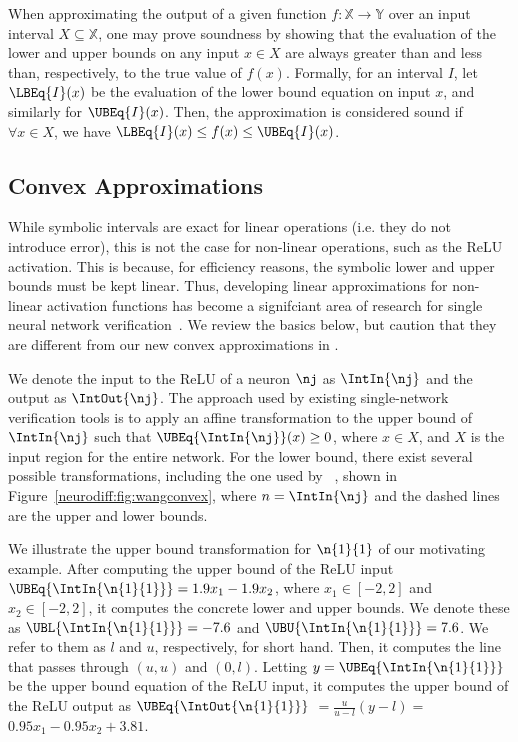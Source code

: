 When approximating the output of a given function $ f
: \mathbb{X} \to \mathbb{Y} $ over an input interval $
X \subseteq \mathbb{X} $, one may prove soundness by showing that the
evaluation of the lower and upper bounds on any input $ x \in X $ are
always greater than and less than, respectively, to the true value of
$ f(x) $.
%
Formally, for an interval $ I $, let $ \LBEq{I}(x) $ be the evaluation
of the lower bound equation on input $ x $, and similarly for
$ \UBEq{I}(x) $. Then, the approximation is considered sound if
$ \forall x \in X$, we have $\LBEq{I}(x) \leq f(x) \leq \UBEq{I}(x) $.

\subsection{Convex Approximations}
While symbolic intervals are exact for linear operations
(i.e. they do not introduce error), this is not the case
for non-linear operations, such as the ReLU activation.
This is because, for efficiency
reasons, the symbolic lower and upper bounds must be kept linear.
Thus, developing linear approximations for non-linear activation
functions has become a signifciant area of research for single neural
network
verification~\cite{WangPWYJ18nips,SinghGPV19,WengZCSHDBD18,zhang2018efficient}. We
review the basics below, but caution that they are different from our
new convex approximations in \Name{}.

We denote the input to the ReLU of a neuron $ \nj $ as $ \IntIn{\nj} $
and the output as $ \IntOut{\nj} $. The approach used by existing
single-network verification tools is to apply an affine transformation
to the upper bound of $ \IntIn{\nj} $ such that
$ \UBEq{\IntIn{\nj}}(x) \geq 0 $, where $ x \in X $, and $ X $ is the
input region for the entire network.  For the lower bound, there exist
several possible transformations, including the one used
by \Neurify{}~\cite{WangPWYJ18nips}, shown in
Figure~\ref{neurodiff:fig:wangconvex}, where $n = \IntIn{\nj}$ and the dashed
lines are the upper and lower bounds.

We illustrate the upper bound transformation for $ \n{1}{1} $ of our
motivating example. After computing the upper bound of the ReLU
input $ \UBEq{\IntIn{\n{1}{1}}} = 1.9x_1 - 1.9x_2 $, where
$x_1\in[-2,2]$ and $x_2\in[-2,2]$, it computes the concrete lower and
upper bounds. We denote these as $ \UBL{\IntIn{\n{1}{1}}} = -7.6 $
and $ \UBU{\IntIn{\n{1}{1}}} = 7.6 $. We refer to them as $ l $ and $
u $, respectively, for short hand. Then, it computes the line that
passes through $ (u, u) $ and $ (0, l) $.
%
Letting $ y = \UBEq{\IntIn{\n{1}{1}}} $ be the upper bound equation of the ReLU
input, it computes the upper bound of the ReLU output as
$ \UBEq{\IntOut{\n{1}{1}}} $ $ = \frac{u}{u - l}(y - l) = $ $ 0.95x_1
-0.95x_2 +3.81 $.

